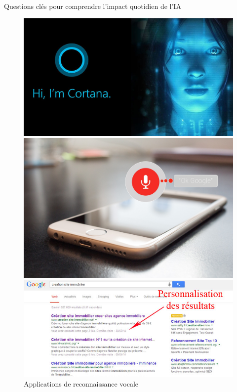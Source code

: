 \documentclass{beamer}
\begin{document}
\begin{frame}{Questions clés pour comprendre l'impact quotidien de l'IA}
		\begin{figure}[h]
			\centering
			\begin{minipage}{0.4\textwidth}
				\centering
				\includegraphics[width=\linewidth]{cortana_.jpg}
				\caption{Assistant personnel intelligent de MS}
			\end{minipage}\hfill
			\begin{minipage}{0.34\textwidth}
				\centering
				\includegraphics[width=\linewidth]{voice-control.jpg}
				\caption{Applications de reconnaissance vocale}
			\end{minipage}
			\vspace{0.5cm}
			\begin{minipage}{0.4\textwidth}
				\centering
				\includegraphics[width=\linewidth]{personnalisation.jpg}

\end{minipage}
\end{figure}
\end{frame}
\end{document}
